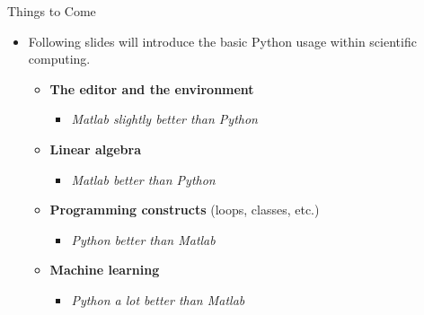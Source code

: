 \documentclass[10pt, aspectratio=169]{beamer} %
\begin{document}
\begin{frame}[fragile]{Things to Come}
\begin{itemize}
\item Following slides will introduce the basic Python usage within scientific computing.
\begin{itemize}
\item \textbf{The editor and the environment} 
\begin{itemize}
\item \emph{Matlab slightly better than Python}
\end{itemize}
\item \textbf{Linear algebra} 
\begin{itemize}
\item \emph{Matlab better than Python}
\end{itemize}
\item \textbf{Programming constructs} (loops, classes, etc.) 
\begin{itemize}
\item  \emph{Python better than Matlab}
\end{itemize}
\item \textbf{Machine learning} 
\begin{itemize}
\item  \emph{Python a lot better than Matlab}
\end{itemize}
\end{itemize}
\end{itemize}
\end{frame}
\end{document}
